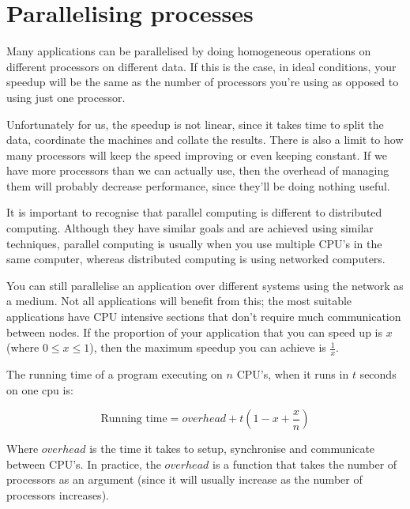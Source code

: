 \section{Parallelising processes}

Many applications can be parallelised by doing homogeneous operations on different
processors on different data. If this is the case, in ideal conditions, your
speedup will be the same as the number of processors you're using as opposed to
using just one processor.

Unfortunately for us, the speedup is not linear, since it takes time to split
the data, coordinate the machines and collate the results. There is also a limit
to how many processors will keep the speed improving or even keeping constant.
If we have more processors than we can actually use, then the overhead of
managing them will probably decrease performance, since they'll be doing nothing
useful.

It is important to recognise that parallel computing is different to distributed
computing. Although they have similar goals and are achieved using similar
techniques, parallel computing is usually when you use multiple CPU's in the
same computer, whereas distributed computing is using networked computers.

You can still parallelise an application over different systems using the
network as a medium. Not all applications will benefit from this; the most
suitable applications have CPU intensive sections that don't require much
communication between nodes. If the proportion of your application that you can
speed up is $x$ (where $0 \leq x \leq 1$), then the maximum speedup you can
achieve is $\frac{1}{x}$.

The running time of a program executing on $n$ CPU's, when it runs in $t$
seconds on one cpu is:


\[
  \text{Running time} = overhead + t\left(1 - x + \frac{x}{n}\right)
\]

Where $overhead$ is the time it takes to setup, synchronise and communicate
between CPU's. In practice, the $overhead$ is a function that takes the number
of processors as an argument (since it will usually increase as the number of
processors increases).


